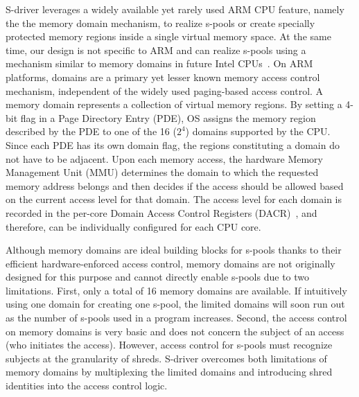 S-driver leverages a widely available yet rarely used ARM CPU feature, namely the 
the memory domain mechanism, to realize s-pools or create specially protected memory regions inside a single virtual memory space. 
At the same time, our design is not specific to ARM and can realize s-pools using a  mechanism similar to memory domains in future Intel CPUs~\cite{mpk15,mpk:rfc}. 
On ARM platforms, domains are a primary yet lesser known memory access control mechanism, independent of the widely used paging-based access control.
A memory domain represents a collection of virtual memory regions. 
By setting a 4-bit flag in a Page Directory Entry (PDE), OS assigns the memory region described by the PDE to one of the 16 ($2^4$) domains supported by the CPU. 
Since each PDE has its own domain flag, the regions constituting a domain do not have to be adjacent. 
Upon each memory access, the hardware Memory Management Unit (MMU) determines the domain to which the requested memory address belongs and then decides if the access should be allowed based on the current access level for that domain. The access level for each domain is recorded in the per-core Domain Access Control Registers (DACR)~\cite{dacr}, and therefore, can be individually configured for each CPU core. 

Although memory domains are ideal building blocks for s-pools thanks to their efficient hardware-enforced access control, memory domains are not originally designed for this purpose and cannot directly enable s-pools due to two limitations. 
First, only a total of 16 memory domains are available. If intuitively using one domain for creating one s-pool, the limited domains will soon run out as the number of s-pools used in a program increases.
Second, the access control on memory domains is very basic and does not concern the subject of an access (\ie who initiates the access). However, access control for s-pools must recognize subjects at the granularity of shreds. 
S-driver overcomes both limitations of memory domains by multiplexing the limited domains and introducing shred identities into the access control logic. 

